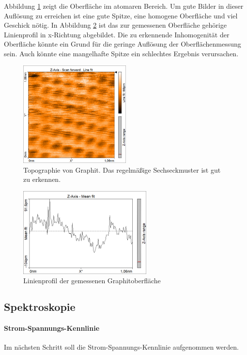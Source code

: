 Abbildung \ref{topo_graphit} zeigt die Oberfläche im atomaren Bereich.
Um gute Bilder in dieser Auflösung zu erreichen ist eine gute Spitze, eine
homogene Oberfläche und viel Geschick nötig.
In Abbildung \ref{graprof} ist das zur gemessenen Oberfläche gehörige Linienprofil
in x-Richtung abgebildet. 
Die zu erkennende Inhomogenität der Oberfläche könnte ein Grund für die 
geringe Auflösung der Oberflächenmessung sein. Auch könnte eine mangelhafte
Spitze ein schlechtes Ergebnis verursachen.
\begin{figure}[H]
    \centering
    \includegraphics[width=0.5\textwidth]{Mess/graphit_oberfl.png}
    \caption{Topographie von Graphit. Das regelmäßige Sechseckmuster ist gut zu erkennen.}
    \label{topo_graphit}
\end{figure}
 
\begin{figure}[h]
    \centering
    \includegraphics[width=0.6\textwidth]{Mess/graphit_linienprofil.png}
    \caption{Linienprofil der gemessenen Graphitoberfläche}
    \label{graprof}
\end{figure}


\subsection{Spektroskopie}
\paragraph{Strom-Spannungs-Kennlinie}
Im nächsten Schritt soll die Strom-Spannungs-Kennlinie aufgenommen werden. 

